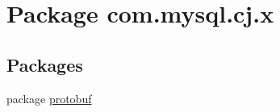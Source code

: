 \hypertarget{namespacecom_1_1mysql_1_1cj_1_1x}{}\section{Package com.\+mysql.\+cj.\+x}
\label{namespacecom_1_1mysql_1_1cj_1_1x}
\subsection*{Packages}
\begin{DoxyCompactItemize}
\item 
package \mbox{\hyperlink{namespacecom_1_1mysql_1_1cj_1_1x_1_1protobuf}{protobuf}}
\end{DoxyCompactItemize}
